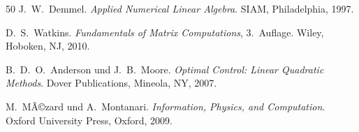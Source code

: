 ﻿\documentclass[a4paper,12pt]{report}
\theoremstyle{definition}
\begin{document}
\begin{thebibliography}{50}
J.~W.~Demmel.
\newblock \textit{Applied Numerical Linear Algebra}.
\newblock SIAM, Philadelphia, 1997.

D.~S.~Watkins.
\newblock \textit{Fundamentals of Matrix Computations}, 3.~Auflage.
\newblock Wiley, Hoboken, NJ, 2010.

B.~D.~O.~Anderson und J.~B.~Moore.
\newblock \textit{Optimal Control: Linear Quadratic Methods}.
\newblock Dover Publications, Mineola, NY, 2007.

M.~MÃ©zard und A.~Montanari.
\newblock \textit{Information, Physics, and Computation}.
\newblock Oxford University Press, Oxford, 2009.

\end{thebibliography}
\end{document}
